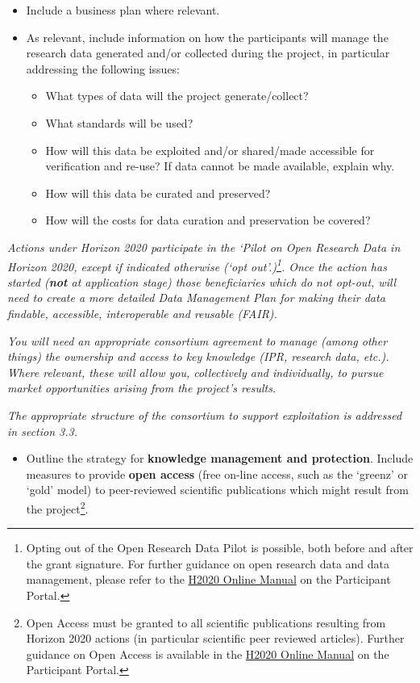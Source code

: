 {\begin{itemize}
\item Include a business plan where relevant.
\item As relevant, include information on how the participants will manage the
research data generated and/or collected during the project, in particular
addressing the following issues:
\begin{itemize}
\item What types of data will the project generate/collect?
\item What standards will be used?
\item How will this data be exploited and/or shared/made accessible for
verification and re-use? If data cannot be made available, explain why.
\item How will this data be curated and preserved?
\item  How will the costs for data curation and preservation be covered?
\end{itemize}
\end{itemize}

\textit{Actions under Horizon 2020 participate in the `Pilot on Open Research
Data in Horizon 2020, except if indicated otherwise (`opt out'.)\footnote{Opting
out of the Open Research Data Pilot is possible, both before and after the grant
signature. For further guidance on open research data and data management,
please refer to the
\href{http://ec.europa.eu/research/participants/docs/h2020-funding-guide/index_en.htm}{H2020
Online Manual} on the Participant Portal.}. Once the action has started
(\textbf{not} at application stage) those beneficiaries which do not opt-out, will
need to create a more detailed Data Management Plan for making their data
findable, accessible, interoperable and reusable (FAIR).}

\textit{You will need an appropriate consortium agreement to manage (among other
things) the ownership and access to key knowledge (IPR, research data, etc.).
Where relevant, these will allow you, collectively and individually, to pursue
market opportunities arising from the project's results.}

\textit{The appropriate structure of the consortium to support exploitation is
addressed in section 3.3.}

\begin{itemize}
\item Outline the strategy for \textbf{knowledge management and protection}.
Include measures to provide \textbf{open access} (free on-line access, such as
the `greenz' or `gold' model) to peer-reviewed scientific publications which
might result from the project\footnote{Open Access must be granted to all
scientific publications resulting from Horizon 2020 actions (in particular
scientific peer reviewed articles). Further guidance on Open Access is available
in the
\href{http://ec.europa.eu/research/participants/docs/h2020-funding-guide/index_en.htm}{H2020
Online Manual} on the Participant Portal.}.
\end{itemize}

}
